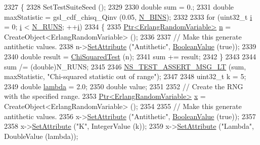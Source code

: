 \begin{DoxyCode}
2327 \{
2328   SetTestSuiteSeed ();
2329 
2330   \textcolor{keywordtype}{double} sum = 0.;
2331   \textcolor{keywordtype}{double} maxStatistic = gsl\_cdf\_chisq\_Qinv (0.05, \hyperlink{classRandomVariableStreamErlangAntitheticTestCase_aa820bbab5f96c340175484666f90e156}{N\_BINS});
2332 
2333   \textcolor{keywordflow}{for} (uint32\_t \hyperlink{bernuolliDistribution_8m_a6f6ccfcf58b31cb6412107d9d5281426}{i} = 0; \hyperlink{bernuolliDistribution_8m_a6f6ccfcf58b31cb6412107d9d5281426}{i} < \hyperlink{classRandomVariableStreamErlangAntitheticTestCase_a8100d0fc6db67c589316e1f5fea966bd}{N\_RUNS}; ++\hyperlink{bernuolliDistribution_8m_a6f6ccfcf58b31cb6412107d9d5281426}{i})
2334     \{
2335       \hyperlink{classns3_1_1Ptr}{Ptr<ErlangRandomVariable>} \hyperlink{namespacesample-rng-plot_aeb5ee5c431e338ef39b7ac5431242e1d}{n} = CreateObject<ErlangRandomVariable> ();
2336 
2337       \textcolor{comment}{// Make this generate antithetic values.}
2338       n->\hyperlink{classns3_1_1ObjectBase_ac60245d3ea4123bbc9b1d391f1f6592f}{SetAttribute} (\textcolor{stringliteral}{"Antithetic"}, \hyperlink{classns3_1_1BooleanValue}{BooleanValue} (\textcolor{keyword}{true}));
2339 
2340       \textcolor{keywordtype}{double} result = \hyperlink{classRandomVariableStreamErlangAntitheticTestCase_a230873884983c67b51b2a254204f639a}{ChiSquaredTest} (n);
2341       sum += result;
2342     \}
2343 
2344   sum /= (double)N\_RUNS;
2345 
2346   \hyperlink{group__testing_ga1d96848b91407c9a0b36583e8b0ad7ae}{NS\_TEST\_ASSERT\_MSG\_LT} (sum, maxStatistic, \textcolor{stringliteral}{"Chi-squared statistic out of range"});
2347 
2348   uint32\_t k = 5;
2349   \textcolor{keywordtype}{double} \hyperlink{loss__ITU1238_8m_aca36b09d6e71a60cfa3837d7e24c07ca}{lambda} = 2.0;
2350   \textcolor{keywordtype}{double} value;
2351 
2352   \textcolor{comment}{// Create the RNG with the specified range.}
2353   \hyperlink{classns3_1_1Ptr}{Ptr<ErlangRandomVariable>} \hyperlink{lte__link__budget__x2__handover__measures_8m_a9336ebf25087d91c818ee6e9ec29f8c1}{x} = CreateObject<ErlangRandomVariable> ();
2354 
2355   \textcolor{comment}{// Make this generate antithetic values.}
2356   x->\hyperlink{classns3_1_1ObjectBase_ac60245d3ea4123bbc9b1d391f1f6592f}{SetAttribute} (\textcolor{stringliteral}{"Antithetic"}, \hyperlink{classns3_1_1BooleanValue}{BooleanValue} (\textcolor{keyword}{true}));
2357 
2358   x->\hyperlink{classns3_1_1ObjectBase_ac60245d3ea4123bbc9b1d391f1f6592f}{SetAttribute} (\textcolor{stringliteral}{"K"}, IntegerValue (k));
2359   x->\hyperlink{classns3_1_1ObjectBase_ac60245d3ea4123bbc9b1d391f1f6592f}{SetAttribute} (\textcolor{stringliteral}{"Lambda"}, DoubleValue (lambda));

\end{DoxyCode}
